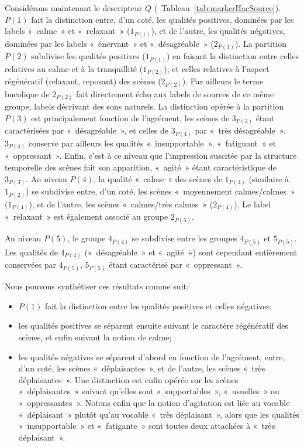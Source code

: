 Considérons maintenant le descripteur $Q$ (\cf~Tableau~\ref{tab:markerHacSource}). $P(1)$ fait la distinction entre, d'un coté, les qualités positives, dominées par les labels «~calme~» et «~relaxant~» ($1_{P(1)}$), et de l'autre, les qualités négatives, dominées par les labels «~énervant~» et «~désagréable~» ($2_{P(1)}$). La partition $P(2)$ subdivise les qualités positives ($1_{P(1)}$) en faisant la distinction entre celles relatives au calme et à la tranquillité ($1_{P(2)}$), et celles relatives à l'aspect régénératif (relaxant, reposant) des scènes ($2_{P(2)}$). Par ailleurs le terme bucolique de $2_{P(2)}$ fait directement écho aux labels de sources de ce même groupe, labels décrivant des sons naturels. La distinction opérée à la partition $P(3)$ est principalement fonction de l'agrément, les scènes de $3_{P(3)}$ étant caractérisées par «~désagréable~», et celles de $3_{P(4)}$ par «~très désagréable~». $3_{P(4)}$ conserve par ailleurs les qualités «~insupportable~», «~fatiguant~» et «~oppressant~». Enfin, c'est à ce niveau que l'impression suscitée par la structure temporelle des scènes fait son apparition, «~agité~» étant caractéristique de $3_{P(3)}$. Au niveau $P(4)$, la qualité «~calme~» des scènes de $1_{P(3)}$ (similaire à $1_{P(2)}$) se subdivise entre, d'un coté, les scènes «~moyennement calmes/calmes~» ($1_{P(4)}$), et de l'autre, les scènes «~calmes/très calmes~» ($2_{P(4)}$). Le label «~relaxant~» est également associé au groupe $2_{P(5)}$.

Au niveau $P(5)$, le groupe $4_{P(4)}$ se subdivise entre les groupes $4_{P(5)}$ et $5_{P(5)}$. Les qualités de $4_{P(4)}$ («~désagréable~» et «~agité~») sont cependant entièrement conservées par $4_{P(5)}$, $5_{P(5)}$ étant caractérisé par «~oppressant~».

Nous pouvons synthétiser ces résultats comme suit:

\begin{itemize}
\item $P(1)$ fait la distinction entre les qualités positives et celles négatives;
\item les qualités positives se séparent ensuite suivant le caractère régénératif des scènes, et enfin suivant la notion de calme;
\item les qualités négatives se séparent d'abord en fonction de l'agrément, entre, d'un coté, les scènes «~déplaisantes~», et de l'autre, les scènes «~très déplaisantes~». Une distinction est enfin opérée sur les scènes «~déplaisantes~» suivant qu'elles sont «~supportables~», «~usuelles~» ou «~oppressantes~». Notons enfin que la notion d'agitation est liée au vocable «~déplaisant~» plutôt qu'au vocable «~très déplaisant~», alors que les qualités «~insupportable~» et «~fatigante~» sont toutes deux attachées à «~très déplaisant~».
\end{itemize}

